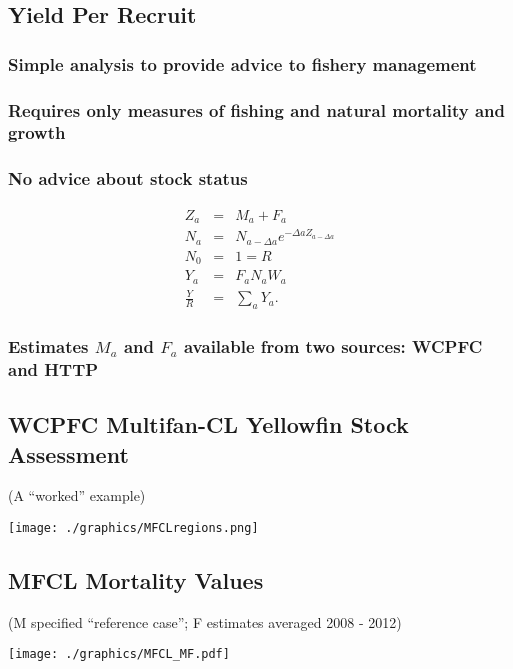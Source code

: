 \documentclass[a4paper,KOMA,landscape,titlepage]{powersem}
\begin{document}
\begin{slide}\section{Yield Per Recruit}
\subsubsection{Simple analysis to provide advice to fishery management}
\subsubsection{Requires only measures of fishing and natural
mortality and growth}
\subsubsection{No advice about stock status}
\begin{eqnarray}
Z_a &=& M_a +F_a \\
N_a &=& N_{a-\Delta a}e^{-\Delta aZ_{a-\Delta a}}\\
N_0 &=& 1 = R\\
Y_a &=& F_aN_aW_a\\
\frac{Y}{R} &=& \sum_a Y_a.
\end{eqnarray}
\subsubsection{Estimates $M_a$ and $F_a$ available from two sources:
WCPFC and HTTP}
\end{slide}

\begin{slide}\section{WCPFC Multifan-CL Yellowfin Stock Assessment}
\begin{center}
{\color{section3}\small (A ``worked'' example)}\par
\texttt{[image: ./graphics/MFCLregions.png]}
\end{center}
\end{slide}

\begin{slide}\section{MFCL Mortality Values}
\begin{center}
{\color{section3}\small (M specified ``reference case''; F estimates averaged 2008 - 2012)}\par
\texttt{[image: ./graphics/MFCL\_MF.pdf]}
\end{center}
\end{slide}
\end{document}
